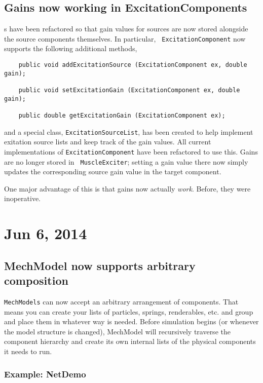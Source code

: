 \documentclass{article}
\begin{document}
\subsection*{Gains now working in ExcitationComponents}

s have been
refactored so that gain values for sources are now stored alongside
the source components themselves.  In particular, {\tt
ExcitationComponent} now supports the following additional methods,
\begin{lstlisting}
    public void addExcitationSource (ExcitationComponent ex, double gain);

    public void setExcitationGain (ExcitationComponent ex, double gain);

    public double getExcitationGain (ExcitationComponent ex);
\end{lstlisting}
and a special class, {\tt ExcitationSourceList}, has been created to
help implement exitation source lists and keep track of the gain
values. All current implementations of {\tt ExcitationComponent} have
been refactored to use this. Gains are no longer stored in {\tt
MuscleExciter}; setting a gain value there now simply updates the
corresponding source gain value in the target component.

One major advantage of this is that gains now actually {\it work}.
Before, they were inoperative.

\section*{Jun 6, 2014}

\subsection*{MechModel now supports arbitrary composition}

{\tt MechModels} can now accept an arbitrary arrangement of
components. That means you can create your lists of particles,
springs, renderables, etc. and group and place them in whatever way is
needed. Before simulation begins (or whenever the model structure is
changed), MechModel will recursively traverse the component hierarchy
and create its own internal lists of the physical components it needs
to run.

\subsubsection*{Example: NetDemo}
\end{document}
